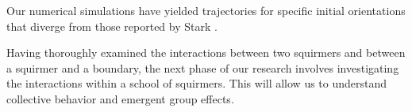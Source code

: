 \documentclass{article}
\begin{document}
 Our numerical simulations have yielded trajectories for specific initial orientations that diverge from those reported by Stark \cite{Stark}.
 
 Having thoroughly examined the interactions between two squirmers and between a squirmer and a boundary, the next phase of our research involves investigating the interactions within a school of squirmers. This will allow us to understand collective behavior and emergent group effects.
\newpage

\nocite{*}


\end{document}
